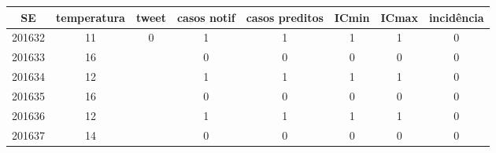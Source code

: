 \begin{tabular}{c|ccccccc}
  \hline
SE & temperatura & tweet & casos notif & casos preditos & ICmin & ICmax & incidência \\ 
  \hline
201632 & 11 & 0 & 1 & 1 & 1 & 1 & 0 \\ 
  201633 & 16 &  & 0 & 0 & 0 & 0 & 0 \\ 
  201634 & 12 &  & 1 & 1 & 1 & 1 & 0 \\ 
  201635 & 16 &  & 0 & 0 & 0 & 0 & 0 \\ 
  201636 & 12 &  & 1 & 1 & 1 & 1 & 0 \\ 
  201637 & 14 &  & 0 & 0 & 0 & 0 & 0 \\ 
   \hline
\end{tabular}
